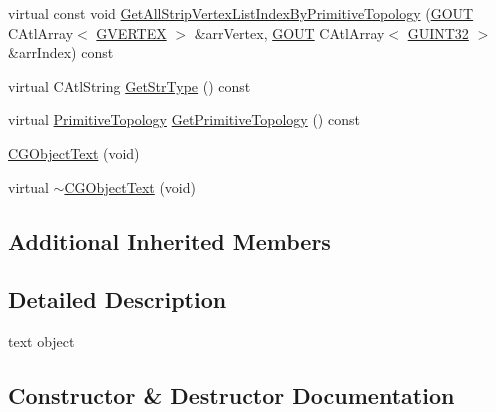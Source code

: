 \begin{DoxyCompactItemize}
\item 
virtual const void \hyperlink{class_c_g_object_text_a4059843c0dc551906d8916eb297dd793}{Get\+All\+Strip\+Vertex\+List\+Index\+By\+Primitive\+Topology} (\hyperlink{_g_types_8h_a0858ec221262e635612871d70ca233ad}{G\+O\+U\+T} C\+Atl\+Array$<$ \hyperlink{struct_g_v_e_r_t_e_x}{G\+V\+E\+R\+T\+E\+X} $>$ \&arr\+Vertex, \hyperlink{_g_types_8h_a0858ec221262e635612871d70ca233ad}{G\+O\+U\+T} C\+Atl\+Array$<$ \hyperlink{_g_types_8h_a2e1a1c77d1349057202e2f34e071019c}{G\+U\+I\+N\+T32} $>$ \&arr\+Index) const 
\item 
virtual C\+Atl\+String \hyperlink{class_c_g_object_text_ad658d2cafc3e33a17ec7f4f93a60f7ae}{Get\+Str\+Type} () const 
\item 
virtual \hyperlink{_g_types_8h_a940e3da6a9b57aae3de0b050e2a7af5e}{Primitive\+Topology} \hyperlink{class_c_g_object_text_ae0c72c395cc3567a6f212029b4e24754}{Get\+Primitive\+Topology} () const 
\item 
\hyperlink{class_c_g_object_text_af647571a5b3bbd51fdec036492e999ba}{C\+G\+Object\+Text} (void)
\item 
virtual \hyperlink{class_c_g_object_text_a4d5c5a1d889a1d71db05a3ecea5c425c}{$\sim$\+C\+G\+Object\+Text} (void)
\end{DoxyCompactItemize}
\subsection*{Additional Inherited Members}


\subsection{Detailed Description}

\begin{DoxyItemize}
\item text object 
\end{DoxyItemize}

\subsection{Constructor \& Destructor Documentation}
\hypertarget{class_c_g_object_text_af647571a5b3bbd51fdec036492e999ba}{}
